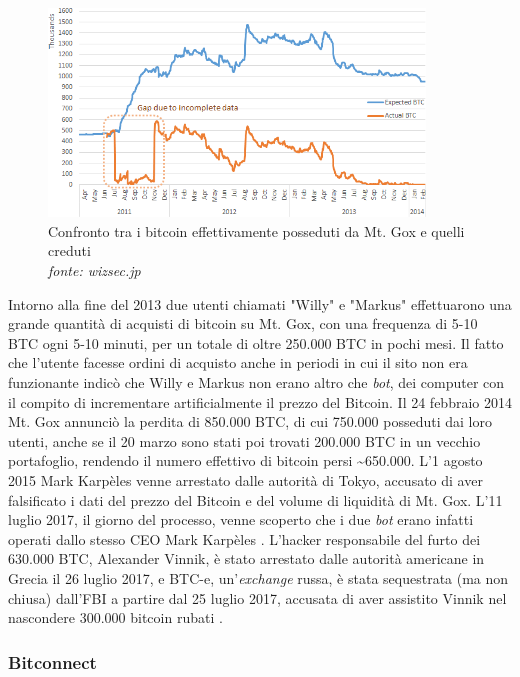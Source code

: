\documentclass {article}
\begin{document}
\vspace {0.5cm}
\begin{figure}[htb!]
\includegraphics [width = 10cm] {mtgox.png}
\centering
\captionsetup{width=1.4\linewidth}
\caption {Confronto tra i bitcoin effettivamente posseduti da Mt. Gox e quelli creduti\\\textit{fonte: wizsec.jp}}
\end{figure}
\vspace {0.2cm}
\noindent
%
Intorno alla fine del 2013 due utenti chiamati "Willy" e "Markus" effettuarono una grande quantità di acquisti di bitcoin su Mt. Gox, con una frequenza di 5-10 BTC ogni 5-10 minuti, per un totale di oltre 250.000 BTC in pochi mesi.
Il fatto che l'utente facesse ordini di acquisto anche in periodi in cui il sito non era funzionante indicò che Willy e Markus non erano altro che \textit{bot}, dei computer con il compito di incrementare artificialmente il prezzo del Bitcoin.
Il 24 febbraio 2014 Mt. Gox annunciò la perdita di 850.000 BTC, di cui 750.000 posseduti dai loro utenti, anche se il 20 marzo sono stati poi trovati 200.000 BTC in un vecchio portafoglio, rendendo il numero effettivo di bitcoin persi \textasciitilde 650.000.
L'1 agosto 2015 Mark Karpèles venne arrestato dalle autorità di Tokyo, accusato di aver falsificato i dati del prezzo del Bitcoin e del volume di liquidità di Mt. Gox.
L'11 luglio 2017, il giorno del processo, venne scoperto che i due \textit{bot} erano infatti operati dallo stesso CEO Mark Karpèles \cite{karpelesbot}.
L'hacker responsabile del furto dei 630.000 BTC, Alexander Vinnik, è stato arrestato dalle autorità americane in Grecia il 26 luglio 2017, e BTC-e, un'\textit{exchange} russa, è stata sequestrata (ma non chiusa) dall'FBI a partire dal 25 luglio 2017, accusata di aver assistito Vinnik nel nascondere 300.000 bitcoin rubati \cite{mtgox}.

\subsubsection {Bitconnect}
\end{document}
